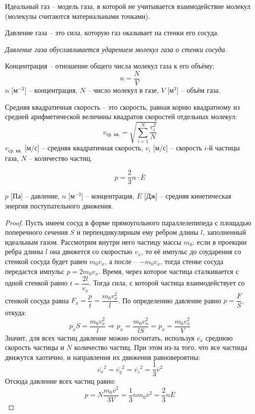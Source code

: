 \documentclass[12pt]{article}
\begin{document}
\begin{definition}
    Идеальный газ -- модель газа, в которой не учитывается взаимодействие молекул (молекулы считаются материальными точками).
\end{definition}
\begin{definition}
    Давление газа -- это сила, которую газ оказывает на стенки его сосуда.\bigskip

    \textit{Давление газа обуславливается ударением молекул газа о стенки сосуда.}
\end{definition}
\begin{definition}
    Концентрация -- отношение общего числа молекул газа к его объёму:
    $$n=\frac{N}{V}$$
    $n$ [м$^{-3}$] -- концентрация, $N$ -- число молекул в газе, $V$ [м$^3$] -- объём газа.
\end{definition}
\begin{definition}
    Средняя квадратичная скорость -- это скорость, равная корню квадратному из средней арифметической величины квадратов скоростей отдельных молекул:
    $$v_{\text{ср. кв.}}=\sqrt{\sum_{i=1}^{N}\frac{v_i^2}{N}}$$
    $v_{\text{ср. кв.}}$ [м/с] -- средняя квадратичная скорость, $v_i$ [м/с] -- скорость $i$-й частицы газа, $N$ -- количество частиц.
\end{definition}
\begin{law}
    $$p=\frac{2}{3}n \cdot \overline{E}$$
    \begin{center}
        \begin{minipage}{12cm}
            $p$ [Па] -- давление, $n$ [м$^{-3}$] -- концентрация, $\overline{E}$ [Дж] -- средняя кинетическая энергия поступательного движения.
        \end{minipage}
    \end{center}
\end{law}
\begin{proof}
    Пусть имеем сосуд в форме прямоугольного параллелепипеда с площадью поперечного сечения $S$ и перпендикулярным ему ребром длины $l$, заполненный идеальным газом. Рассмотрим внутри него частицу массы $m_0$: если в проекции ребра длины $l$ она движется со скоростью $v_x$, то её импульс до соударения со стенкой сосуда будет равен $m_0v_x$, а после -- $-m_0v_x$, тогда стенке сосуда передастся импульс $p=2m_0v_x$. Время, через которое частица сталкивается с одной стенкой равно $t=\dfrac{2l}{v_x}$. Тогда сила, с которой частица взаимодействует со стенкой сосуда равна $F_x=\dfrac{p}{t}=\dfrac{m_0v_x^2}{l}$. По определению давление равно $p=\dfrac{F}{S}$, откуда:
    $$p_xS=\frac{m_0v_x^2}{l}\Longrightarrow p_x=\frac{m_0v_x^2}{lS}=p_x=\frac{m_0v_x^2}{V}$$
    Значит, для всех частиц давление можно посчитать, используя $\overline{v_x}$ среднюю скорость частицы и $N$ количество частиц. При этом из-за того, что все частицы движутся хаотично, и направления их движения равновероятны:
    $$\overline{v_x}^2=\overline{v_y}^2=\overline{v_z}^2=\frac{1}{3}\overline{v}^2$$
    Отсюда давление всех частиц равно:
    $$p=N\frac{m_0\overline{v}^2}{3V}=\frac{1}{3}nm_0\overline{v}^2=\frac{2}{3}n\overline{E}$$
\end{proof}
\end{document}
